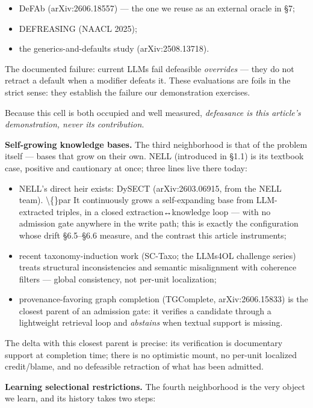 \documentclass[11pt]{article}
\begin{document}
\begin{itemize}
\item DeFAb (arXiv:2606.18557) — the one we reuse as an external oracle in §7;
\item DEFREASING (NAACL 2025);
\item the generics-and-defaults study (arXiv:2508.13718).
\end{itemize}

The documented failure: current LLMs fail defeasible \emph{overrides} — they do not retract a default when a modifier defeats it. These evaluations are foils in the strict sense: they establish the failure our demonstration exercises.

Because this cell is both occupied and well measured, \emph{defeasance is this article's demonstration, never its contribution}.

\textbf{Self-growing knowledge bases.} The third neighborhood is that of the problem itself — bases that grow on their own. NELL (introduced in §1.1) is its textbook case, positive and cautionary at once; three lines live there today:

\begin{itemize}
\item NELL's direct heir exists: DySECT (arXiv:2603.06915, from the NELL team). \textbackslash\{\}par It continuously grows a self-expanding base from LLM-extracted triples, in a closed extraction↔knowledge loop — with no admission gate anywhere in the write path; this is exactly the configuration whose drift §6.5–§6.6 measure, and the contrast this article instruments;

\item recent taxonomy-induction work (SC-Taxo; the LLMs4OL challenge series) treats structural inconsistencies and semantic misalignment with coherence filters — global consistency, not per-unit localization;
\item provenance-favoring graph completion (TGComplete, arXiv:2606.15833) is the closest parent of an admission gate: it verifies a candidate through a lightweight retrieval loop and \emph{abstains} when textual support is missing.
\end{itemize}

The delta with this closest parent is precise: its verification is documentary support at completion time; there is no optimistic mount, no per-unit localized credit/blame, and no defeasible retraction of what has been admitted.

\textbf{Learning selectional restrictions.} The fourth neighborhood is the very object we learn, and its history takes two steps:
\end{document}
